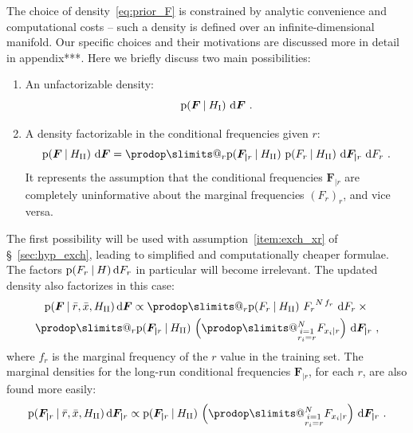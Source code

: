 \documentclass[\ifafour a4paper,12pt,\else a5paper,10pt,\fi%
onecolumn,oneside,article,%
british%
]{memoir}
\makeatletter
\theoremstyle{remark}
\theoremstyle{innote}
\def\prod{\DOTSI\prodop\slimits@}
\newcommand*{\di}{\mathrm{d}}%
\newcommand*{\p}{\mathrm{p}}%
\renewcommand*{\|}[1][]{\nonscript\:#1\vert\nonscript\:\mathopen{}}
\renewcommand*{\=}{\TextOrMath\texteq\eq}
\newcommand*{\sect}{\S}%
\newcommand*{\wrench}{{\fontencoding{U}\fontfamily{fontawesomethree}\selectfont\symbol{114}}}
\newcommand{\mynote}[1]{ {\color{notecolour}#1}}
\newcommand*{\q}{}%
\DeclareRobustCommand*{\q}{%
  \mathord{\mathpalette\bigcdot@{}}%
}
\newcommand*{\bigcdot@scalefactor}{0.7}
\newcommand*{\bigcdot@widthfactor}{1.5}
\newcommand*{\bigcdot@}[2]{%
  \sbox0{$#1\vcenter{}$}%
  \sbox2{$#1\cdot\m@th$}%
  \hbox to \bigcdot@widthfactor\wd2{%
    \hfil
    \raise\ht0\hbox{%
      \scalebox{\bigcdot@scalefactor}{%
        \lower\ht0\hbox{$#1\bullet\m@th$}%
      }%
    }%
    \hfil
  }%
}
\newcommand*{\ro}{r}
\newcommand*{\rd}{\bar{r}}
\newcommand*{\xd}{\bar{x}}
\newcommand*{\yF}{\bm{F}}
\newcommand*{\yFr}{\yF_{\bm{\mid}r}}
\makeatother
\begin{document}
The choice of density~\eqref{eq:prior_F} is constrained by analytic
convenience and computational costs -- such a density is defined over an
infinite-dimensional manifold. Our specific choices and their motivations are
discussed more in detail in \mynote{\wrench appendix***}. Here we briefly
discuss two main possibilities:
\begin{enumerate}[label=\Roman*.]
\item\label{item:p_F_unfactorizable} An unfactorizable density:
    \begin{equation}
    \label{eq:p_F_unfactorizable}
    \p(\yF\| H_{\textrm{I}})\ \di\yF 
    \ .
  \end{equation}

\item\label{item:p_F_factorizable} A density factorizable in the
  conditional frequencies given $r$:
  \begin{equation}
    \label{eq:p_F_factorizable}
    \p(\yF\| H_{\textrm{II}})\ \di\yF =
    \prod_{r} \p(\yFr \| H_{\textrm{II}})\
    \p(F_{r\q} \| H_{\textrm{II}})\ \di\yFr\ \di F_{r\q} \ .
  \end{equation}
  It represents the assumption that the conditional frequencies $\yFr$ are
  completely uninformative about the marginal frequencies $(F_{r\q})_{r}$,
  and vice versa.
\end{enumerate}
The first possibility will be used with assumption~\ref{item:exch_xr} of
\sect~\ref{sec:hyp_exch}, leading to simplified and computationally cheaper
formulae. The factors $\p(F_{r\q} \| H)\,\di F_{r\q}$ in particular will
become irrelevant. The updated density also factorizes in this case:
  \begin{multline}
  \label{eq:post_prob_F_factorizable}
  \p(\yF\|\rd,\xd, H_{\textrm{II}})\,\di\yF \propto
  \prod_{r} \p(F_{r\q} \| H_{\textrm{II}})\ {F_{r\q}}^{N\,f_{r\q}}\
  \di F_{r\q} \times{}\\
  \prod_{r} \p(\yFr \| H_{\textrm{II}})\
  \Bigl(\prod_{\substack{i=1\\r_{i}=\ro}}^{N} F_{x_{i}\mid \ro}\Bigr)\ \di\yFr \ ,
\end{multline}
where $f_{r\q}$ is the marginal frequency of the $r$ value in the training
set. The marginal densities for the long-run conditional frequencies
$\yFr$, for each $r$, are also found more easily:
  \begin{equation}
  \label{eq:post_prob_Fxcondr}
  \p(\yFr\|\rd,\xd, H_{\textrm{II}})\,\di\yFr \propto
  \p(\yFr \| H_{\textrm{II}})\
  \Bigl(\prod_{\substack{i=1\\r_{i}=\ro}}^{N} F_{x_{i}\mid \ro}\Bigr)\ \di\yFr \ .
\end{equation}
\end{document}
